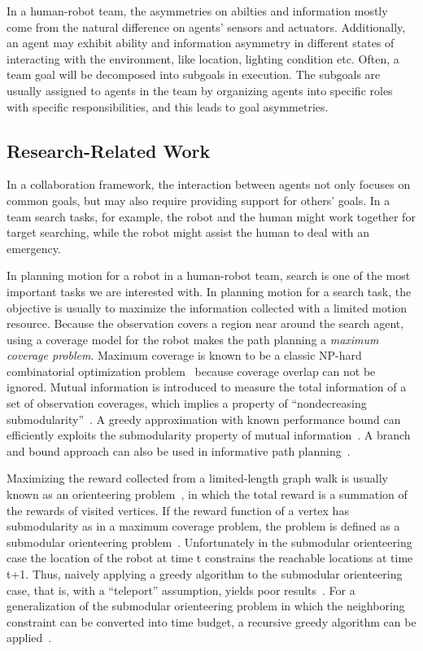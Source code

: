 \documentclass[phd]{byuprop}
\begin{document}
In a human-robot team, the asymmetries on abilties and information mostly come from the natural difference on agents’ sensors and actuators. 
Additionally, an agent may exhibit ability and information asymmetry in different states of interacting with the environment, like location, lighting condition etc. 
Often, a team goal will be decomposed into subgoals in execution. 
The subgoals are usually assigned to agents in the team by organizing agents into specific roles with specific responsibilities, and this leads to goal asymmetries.

\subsection{Research-Related Work}

In a collaboration framework, the interaction between agents not only focuses on common goals, but may also require providing support for others’ goals. 
In a team search tasks, for example, the robot and the human might work together for target searching, while the robot might assist the human to deal with an emergency.

In planning motion for a robot in a human-robot team, search is one of the most important tasks we are interested with.
In planning motion for a search task, the objective is usually to maximize the information collected with a limited motion resource.
Because the observation covers a region near around the search agent, using a coverage model for the robot makes the path planning a {\em maximum coverage problem}.
Maximum coverage is known to be a classic NP-hard combinatorial optimization problem~\cite{Megiddo1983} because coverage overlap can not be ignored. 
Mutual information is introduced to measure the total information
of a set of observation coverages, which implies a property of
“nondecreasing submodularity”~\cite{Singh2009}. 
A greedy approximation with known performance bound can efficiently exploits the submodularity property of mutual information~\cite{Singh2009}. 
A branch and bound approach can also be used in informative path
planning~\cite{Binney2012}.

Maximizing the reward collected from a limited-length graph walk is usually known as an orienteering problem~\cite{Vansteenwegen2011}, in which the total reward is a summation of the rewards of visited vertices. 
If the reward function of a vertex has submodularity as in a maximum coverage problem, the problem is defined as a submodular orienteering problem~\cite{Chekuri2005}. 
Unfortunately in the submodular orienteering case the location of the robot at time t constrains the reachable locations at time t+1.
Thus, naively applying a greedy algorithm to the submodular orienteering case, that is, with a “teleport” assumption, yields poor results~\cite{Krause2012}. 
For a generalization of the submodular orienteering problem in which the neighboring constraint can be converted into time budget, a recursive greedy algorithm can be applied~\cite{Chekuri2005}.
\end{document}
